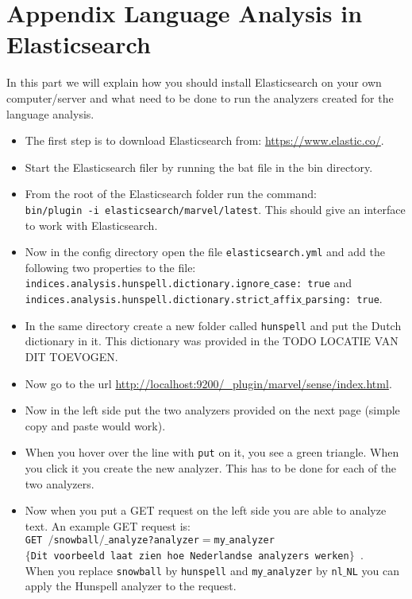 \section{Appendix Language Analysis in Elasticsearch} \label{app:irjasper}
In this part we will explain how you should install Elasticsearch on your own computer/server and what need to be done to run the analyzers created for the language analysis.
\begin{itemize}
\item The first step is to download Elasticsearch from: \url{ https://www.elastic.co/}.
\item Start the Elasticsearch filer by running the bat file in the bin directory.
\item From the root of the Elasticsearch folder run the command: \\
\texttt{bin/plugin -i elasticsearch/marvel/latest}. This should give an interface to work with Elasticsearch.
\item Now in the config directory open the file \texttt{elasticsearch.yml} and add the following two properties to the file: 
\texttt{indices.analysis.hunspell.dictionary.ignore$\_$case: true} and \texttt{indices.analysis.hunspell.dictionary.strict$\_$affix$\_$parsing: true}. 
\item In the same directory create a new folder called \texttt{hunspell} and put the Dutch dictionary in it. This dictionary was provided in the TODO LOCATIE VAN DIT TOEVOGEN.
\item Now go to the url \url{http://localhost:9200/_plugin/marvel/sense/index.html}.
\item Now in the left side put the two analyzers provided on the next page (simple copy and paste would work).
\item When you hover over the line with \texttt{put} on it, you see a green triangle. When you click it you create the new analyzer. This has to be done for each of the two analyzers.
\item Now when you put a GET request on the left side you are able to analyze text. An example GET request is:\\
\texttt{GET $/$snowball$/$$\_$analyze?analyzer$=$my$\_$analyzer }\\
\texttt{$\{$Dit voorbeeld laat zien hoe Nederlandse analyzers werken$\}$ }.\\
When you replace \texttt{snowball} by \texttt{hunspell} and \texttt{my$\_$analyzer} by \texttt{nl$\_$NL} you can apply the Hunspell analyzer to the request. 
\end{itemize}
\newpage

